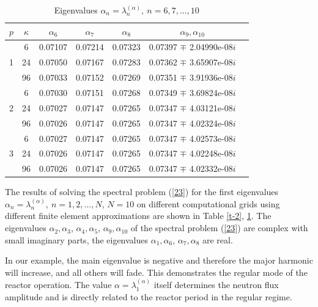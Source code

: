 \documentclass[authoryear]{elsarticle}
\begin{document}
\begin{table}[h]
\caption{Eigenvalues $\alpha_n = \lambda_n^{(\alpha )}, \ n = 6,7, ..., 10$}
\label{t-3}
\begin{center}
\begin{tabular}{ccccccc}
\hline
$p$ & $\kappa$ & $\alpha_6$ &  $\alpha_7$ & $\alpha_8$ &  $\alpha_9, \alpha_{10}$ \\ 
\hline
& 6 & 0.07107  & 0.07214  & 0.07323  & 0.07397 $\mp$ 2.04990e-08$i$ \\
1 & 24 & 0.07050  & 0.07167  & 0.07283  & 0.07362 $\mp$ 3.65907e-08$i$ \\
& 96 & 0.07033  & 0.07152  & 0.07269  & 0.07351 $\mp$ 3.91936e-08$i$  \\
\hline
& 6  & 0.07030  & 0.07151  & 0.07268  & 0.07349 $\mp$ 3.69824e-08$i$ \\
2 & 24 & 0.07027  & 0.07147  & 0.07265  & 0.07347 $\mp$ 4.03121e-08$i$ \\
& 96  & 0.07026  & 0.07147  & 0.07265  & 0.07347 $\mp$ 4.02324e-08$i$ \\
\hline
& 6 & 0.07027  & 0.07147  & 0.07265  & 0.07347 $\mp$ 4.02573e-08$i$ \\
3 & 24 & 0.07026  & 0.07147  & 0.07265  & 0.07347 $\mp$ 4.02248e-08$i$ \\
& 96 & 0.07026  & 0.07147  & 0.07265  & 0.07347 $\mp$ 4.02332e-08$i$ \\
\hline
\end{tabular}
\end{center}
\end{table}

The results of solving the spectral problem (\ref{23}) for the first eigenvalues  $\alpha_n = \lambda_n^{(\alpha)}, \ n = 1,2, ..., N$, $ N=10$
on different computational grids using different finite element approximations are shown in Table \ref{t-2}, \ref{t-3}. The eigenvalues $\alpha_2, \alpha_3$, $\alpha_4, \alpha_5$, $\alpha_9, \alpha_{10}$ 
of the spectral problem (\ref{23}) are complex with small imaginary parts, the eigenvalues $\alpha_1, \alpha_6$, $\alpha_7, \alpha_8$ are real.

In our example, the main eigenvalue is negative and therefore the major harmonic will increase, and all others will fade. This demonstrates the regular mode of the reactor operation. The value $\alpha = \lambda_1^{(\alpha)}$ itself determines the neutron flux amplitude and is directly related to the reactor period in the regular regime.
\end{document}
